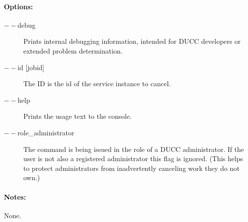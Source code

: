     \paragraph{Options:}
    \begin{description}
        \item[$--$debug ]          
          Prints internal debugging information, intended for DUCC developers or extended problem determination.          
        \item[$--$id {[jobid]}]
          The ID is the id of the service instance to cancel.
        \item[$--$help]
          Prints the usage text to the console. 
        \item[$--$role\_administrator] The command is being issued in the role of a DUCC administrator.
          If the user is not also a registered administrator this flag is ignored.  (This helps to
          protect administrators from inadvertently canceling work they do not own.)
     \end{description}
        
    \paragraph{Notes:}
    None.

